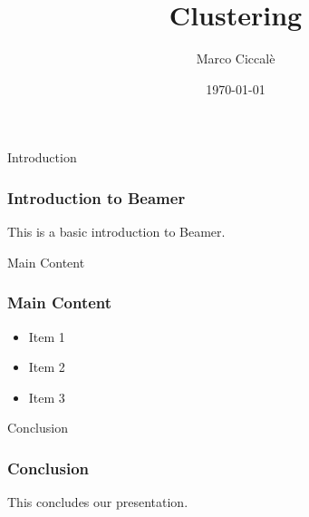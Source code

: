 \documentclass{beamer}
\title{Clustering}
\author{Marco Ciccalè}
\institute{UPM}
\date{\today}
\begin{document}
\begin{frame}
  \titlepage
\end{frame}

\begin{frame}{Introduction}
  \frametitle{Introduction to Beamer}
  This is a basic introduction to Beamer.
\end{frame}

\begin{frame}{Main Content}
  \frametitle{Main Content}
  \begin{itemize}
    \item Item 1
    \item Item 2
    \item Item 3
  \end{itemize}
\end{frame}

\begin{frame}{Conclusion}
  \frametitle{Conclusion}
  This concludes our presentation.
\end{frame}
\end{document}
